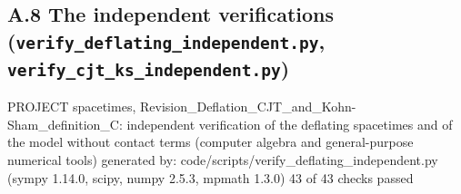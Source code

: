 \documentclass[
  10pt,
]{article}
\newenvironment{Shaded}{}{}
\newcommand{\NormalTok}[1]{#1}
\begin{document}
\hypertarget{a.8-the-independent-verifications-verify_deflating_independent.py-verify_cjt_ks_independent.py}{%
\subsection{\texorpdfstring{A.8 The independent verifications
(\texttt{verify\_deflating\_independent.py},
\texttt{verify\_cjt\_ks\_independent.py})}{A.8 The independent verifications (verify\_deflating\_independent.py, verify\_cjt\_ks\_independent.py)}}\label{a.8-the-independent-verifications-verify_deflating_independent.py-verify_cjt_ks_independent.py}}

\begin{Shaded}
\begin{Highlighting}[]
\NormalTok{PROJECT spacetimes, Revision\_Deflation\_CJT\_and\_Kohn{-}Sham\_definition\_C: independent verification of the deflating spacetimes and of the model without contact terms (computer algebra and general{-}purpose numerical tools)}
\NormalTok{generated by: code/scripts/verify\_deflating\_independent.py (sympy 1.14.0, scipy, numpy 2.5.3, mpmath 1.3.0)}
\NormalTok{43 of 43 checks passed}


\end{Highlighting}
\end{Shaded}
\end{document}
